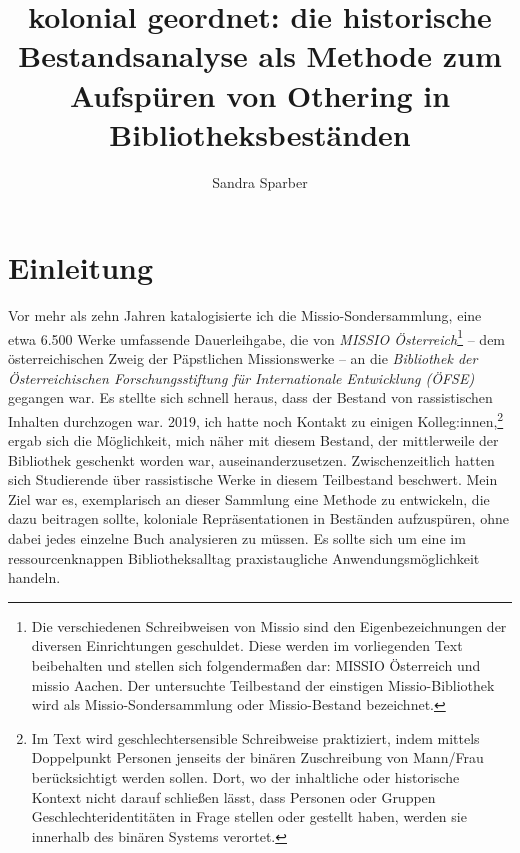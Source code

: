 \documentclass[a4paper,
fontsize=11pt,
oneside,
numbers=noperiodatend,
parskip=half-,
bibliography=totoc,
final
]{scrartcl}
\title{\LARGE{kolonial geordnet: die historische Bestandsanalyse als Methode zum Aufspüren von Othering in Bibliotheksbeständen
}}%
\author{Sandra Sparber} %
\date{}
\begin{document}
\maketitle
\thispagestyle{fancyplain} 


\hypertarget{einleitung}{%
\section{Einleitung}\label{einleitung}}

Vor mehr als zehn Jahren katalogisierte ich die Missio-Sondersammlung,
eine etwa 6.500 Werke umfassende Dauerleihgabe, die von \emph{MISSIO
Österreich}\footnote{Die verschiedenen Schreibweisen von Missio sind den
  Eigenbezeichnungen der diversen Einrichtungen geschuldet. Diese werden
  im vorliegenden Text beibehalten und stellen sich folgendermaßen dar:
  MISSIO Österreich und missio Aachen. Der untersuchte Teilbestand der
  einstigen Missio-Bibliothek wird als Missio-Sondersammlung oder
  Missio-Bestand bezeichnet.} -- dem österreichischen Zweig der
Päpstlichen Missionswerke -- an die \emph{Bibliothek der
Österreichischen Forschungsstiftung für Internationale Entwicklung
(ÖFSE)} gegangen war. Es stellte sich schnell heraus, dass der Bestand
von rassistischen Inhalten durchzogen war. 2019, ich hatte noch Kontakt
zu einigen Kolleg:innen,\footnote{Im Text wird geschlechtersensible
  Schreibweise praktiziert, indem mittels Doppelpunkt Personen jenseits
  der binären Zuschreibung von Mann/Frau berücksichtigt werden sollen.
  Dort, wo der inhaltliche oder historische Kontext nicht darauf
  schließen lässt, dass Personen oder Gruppen Geschlechteridentitäten in
  Frage stellen oder gestellt haben, werden sie innerhalb des binären
  Systems verortet.} ergab sich die Möglichkeit, mich näher mit diesem
Bestand, der mittlerweile der Bibliothek geschenkt worden war,
auseinanderzusetzen. Zwischenzeitlich hatten sich Studierende über
rassistische Werke in diesem Teilbestand beschwert. Mein Ziel war es,
exemplarisch an dieser Sammlung eine Methode zu entwickeln, die dazu
beitragen sollte, koloniale Repräsentationen in Beständen aufzuspüren,
ohne dabei jedes einzelne Buch analysieren zu müssen. Es sollte sich um
eine im ressourcenknappen Bibliotheksalltag praxistaugliche
Anwendungsmöglichkeit handeln.
\end{document}
